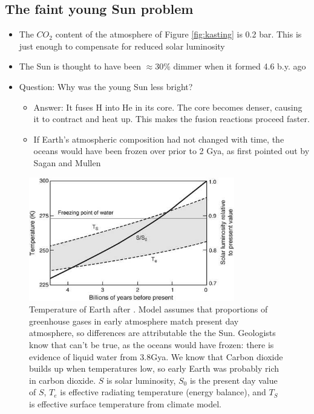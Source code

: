 \documentclass[]{article}
\begin{document}
\subsection{The faint young Sun problem}

\begin{itemize}
	\item The $CO_2$ content of the atmosphere of Figure \ref{fig:kasting} is 0.2 bar. This is 	just enough to compensate for reduced solar luminosity
	\item The Sun is thought to have been $\approx30\%$ dimmer when it
	formed 4.6 b.y. ago \cite{gough1981solar}
	\item Question: Why was the young Sun less bright?
	\begin{itemize}
		\item Answer: It fuses H into He in its core. The core becomes 	denser, causing it to contract 	and heat up. This makes the fusion reactions proceed faster.
		\item If Earth’s atmospheric composition had not changed with time, the oceans would 	have been frozen over prior to 2 Gya, as first pointed out by Sagan and Mullen \cite{sagan1972earth}
	\end{itemize}
\end{itemize}
\begin{figure}[H]
	\caption[Temperature of Earth]{Temperature of Earth after \cite{kasting1988climate}. Model assumes that proportions of greenhouse gases in early atmosphere match present day atmosphere, so differences are attributable the the Sun. Geologists know that can't be true, as the oceans would have frozen: there is evidence of liquid water from 3.8Gya. We know that Carbon dioxide builds up when temperatures low, so early Earth was probably rich in carbon dioxide. $S$ is solar luminosity, $S_0$ is the present day value of $S$, $T_e$ is effective radiating temperature (energy balance), and $T_S$ is effective surface temperature from climate model.}
	\includegraphics[width=0.8\textwidth]{faint-youg-sun}
\end{figure}
\end{document}
